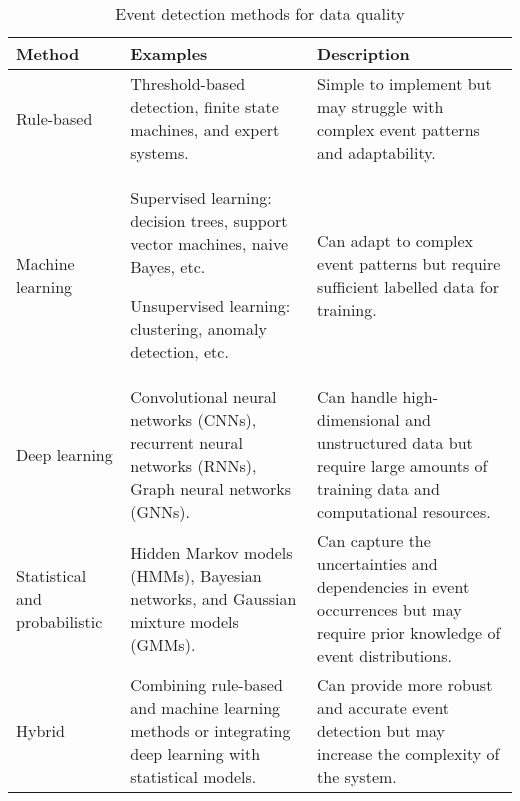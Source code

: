 \begin{table}[H]
    \centering
    \scriptsize %
    \begin{tabular}{|R{2cm}|R{6cm}|R{6cm}|}
        \hline
        \textbf{Method}               & \textbf{Examples}                                                                                       & \textbf{Description}                                                                                                        \\ \hline
        Rule-based                    & Threshold-based detection, finite state machines, and expert systems.                                   & Simple to implement but may struggle with complex event patterns and adaptability.                                          \\ \hline
        Machine learning              & Supervised learning: decision trees, support vector machines, naive Bayes, etc.

        Unsupervised learning: clustering, anomaly detection, etc.
                                      & Can adapt to complex event patterns but require sufficient labelled data for training.                                                                                                                                                \\ \hline
        Deep learning                 & Convolutional neural networks (CNNs), recurrent neural networks (RNNs), Graph neural networks (GNNs).   & Can handle high-dimensional and unstructured data but require large amounts of training data and computational resources.   \\ \hline
        Statistical and probabilistic & Hidden Markov models (HMMs), Bayesian networks, and Gaussian mixture models (GMMs).                     & Can capture the uncertainties and dependencies in event occurrences but may require prior knowledge of event distributions. \\ \hline
        Hybrid                        & Combining rule-based and machine learning methods or integrating deep learning with statistical models. & Can provide more robust and accurate event detection but may increase the complexity of the system.                         \\ \hline
    \end{tabular}
    \caption{Event detection methods for data quality}
    \label{table:event_detection_methods}
\end{table}